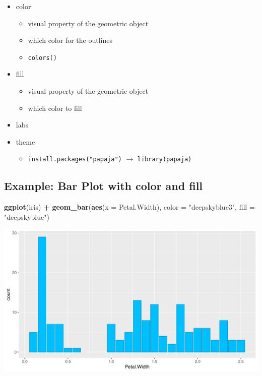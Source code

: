 \documentclass[
]{book}
\newenvironment{Shaded}{\begin{snugshade}}{\end{snugshade}}
\newcommand{\AttributeTok}[1]{\textcolor[rgb]{0.13,0.29,0.53}{#1}}
\newcommand{\FunctionTok}[1]{\textcolor[rgb]{0.13,0.29,0.53}{\textbf{#1}}}
\newcommand{\NormalTok}[1]{#1}
\newcommand{\SpecialCharTok}[1]{\textcolor[rgb]{0.81,0.36,0.00}{\textbf{#1}}}
\newcommand{\StringTok}[1]{\textcolor[rgb]{0.31,0.60,0.02}{#1}}
\providecommand{\tightlist}{%
  \setlength{\itemsep}{0pt}\setlength{\parskip}{0pt}}
\begin{document}
\begin{itemize}
\tightlist
\item
  color

  \begin{itemize}
  \tightlist
  \item
    visual property of the geometric object
  \item
    which color for the outlines
  \item
    \texttt{colors()}
  \end{itemize}
\item
  fill

  \begin{itemize}
  \tightlist
  \item
    visual property of the geometric object
  \item
    which color to fill
  \end{itemize}
\item
  labs
\item
  theme

  \begin{itemize}
  \tightlist
  \item
    \texttt{install.packages("papaja")} \(\rightarrow\) \texttt{library(papaja)}
  \end{itemize}
\end{itemize}

\subsection{Example: Bar Plot with color and fill}\label{example-bar-plot-with-color-and-fill}

\begin{Shaded}
\begin{Highlighting}[]
\FunctionTok{ggplot}\NormalTok{(iris) }\SpecialCharTok{+} 
  \FunctionTok{geom\_bar}\NormalTok{(}\FunctionTok{aes}\NormalTok{(}\AttributeTok{x =}\NormalTok{ Petal.Width), }\AttributeTok{color =} \StringTok{"deepskyblue3"}\NormalTok{, }\AttributeTok{fill =} \StringTok{"deepskyblue"}\NormalTok{)}
\end{Highlighting}
\end{Shaded}

\begin{flushleft}\includegraphics{_main_files/figure-html/unnamed-chunk-33-1} \end{flushleft}
\end{document}
